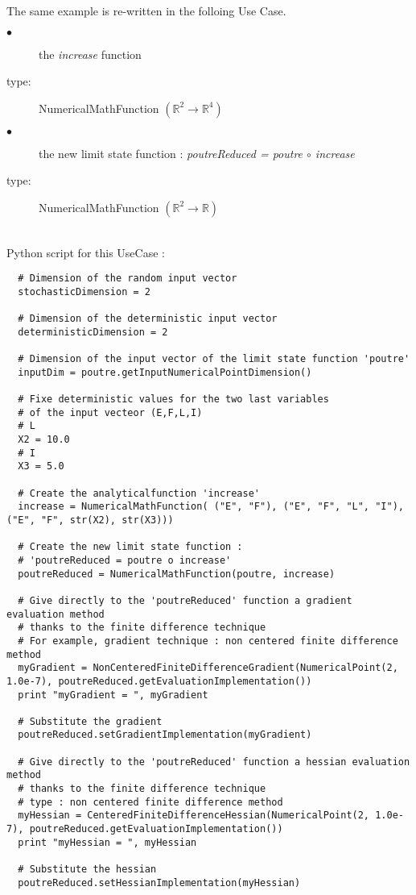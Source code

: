 The same example is re-written in the folloing Use Case.

{
  \begin{description}
  \item[$\bullet$] the {\itshape increase} function
  \item[type:] NumericalMathFunction $(\mathbb{R}^2 \rightarrow \mathbb{R}^4)$
  \item[$\bullet$]  the new limit state function : {\itshape poutreReduced = poutre $\circ$ increase}
  \item[type:] NumericalMathFunction $(\mathbb{R}^2 \rightarrow \mathbb{R})$
  \end{description}
}

\textspace\\
Python script for this UseCase :

\begin{lstlisting}
  # Dimension of the random input vector
  stochasticDimension = 2

  # Dimension of the deterministic input vector
  deterministicDimension = 2

  # Dimension of the input vector of the limit state function 'poutre'
  inputDim = poutre.getInputNumericalPointDimension()

  # Fixe deterministic values for the two last variables
  # of the input vecteor (E,F,L,I)
  # L
  X2 = 10.0
  # I
  X3 = 5.0

  # Create the analyticalfunction 'increase'
  increase = NumericalMathFunction( ("E", "F"), ("E", "F", "L", "I"), ("E", "F", str(X2), str(X3)))

  # Create the new limit state function :
  # 'poutreReduced = poutre o increase'
  poutreReduced = NumericalMathFunction(poutre, increase)

  # Give directly to the 'poutreReduced' function a gradient evaluation method
  # thanks to the finite difference technique
  # For example, gradient technique : non centered finite difference method
  myGradient = NonCenteredFiniteDifferenceGradient(NumericalPoint(2, 1.0e-7), poutreReduced.getEvaluationImplementation())
  print "myGradient = ", myGradient

  # Substitute the gradient
  poutreReduced.setGradientImplementation(myGradient)

  # Give directly to the 'poutreReduced' function a hessian evaluation method
  # thanks to the finite difference technique
  # type : non centered finite difference method
  myHessian = CenteredFiniteDifferenceHessian(NumericalPoint(2, 1.0e-7), poutreReduced.getEvaluationImplementation())
  print "myHessian = ", myHessian

  # Substitute the hessian
  poutreReduced.setHessianImplementation(myHessian)
\end{lstlisting}



